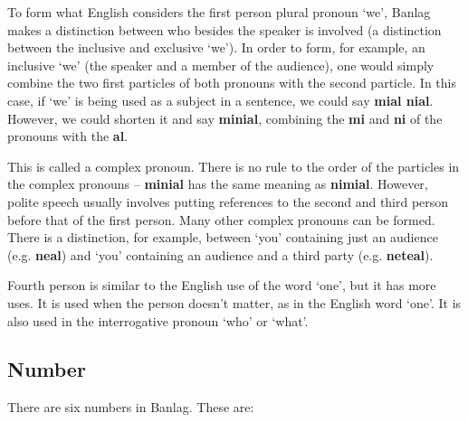 \documentclass[12pt]{report}
\begin{document}
To form what English considers the first person plural pronoun	`we', Banlag makes a distinction between who besides the speaker is involved (a distinction between the inclusive and exclusive `we'). In order to form, for example, an inclusive `we' (the speaker and a member of the audience), one would simply combine the two first particles of both pronouns with the second particle. In this case, if `we' is being used as a subject in a sentence, we could say \textbf{mial nial}. However, we could shorten it and say \textbf{minial}, combining the \textbf{mi} and \textbf{ni} of the pronouns with the \textbf{al}. 

This is called a complex pronoun. There is no rule to the order of the particles in the complex pronouns -- \textbf{minial} has the same meaning as \textbf{nimial}. However, polite speech usually involves putting references to the second and third person before that of the first person. Many other complex pronouns can be formed. There is a distinction, for example, between `you' containing just an audience (e.g. \textbf{neal}) and `you' containing an audience and a third party (e.g. \textbf{neteal}).

Fourth person is similar to the English use of the word `one', but it has more uses. It is used when the person doesn't matter, as in the English word `one'. It is also used in the interrogative pronoun `who' or `what'. 

\subsection{Number}
There are six numbers in Banlag. These are:
\end{document}
